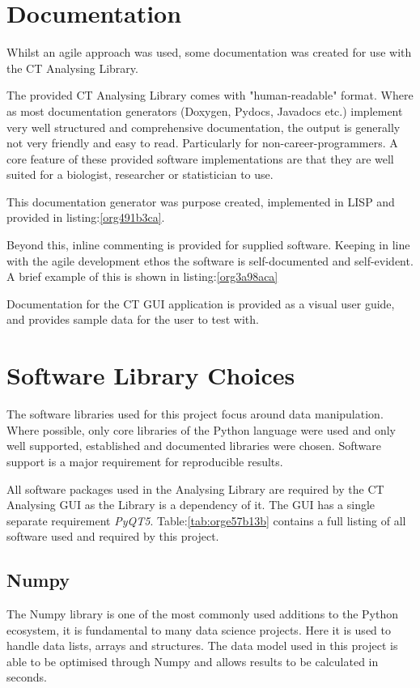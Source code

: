\documentclass[11pt]{report}
\begin{document}
\section{Documentation}
\label{sec:orgca517f7}
Whilst an agile approach was used, some documentation was created for use with the CT Analysing Library.

The provided CT Analysing Library comes with "human-readable" format. Where as most documentation generators (Doxygen, Pydocs, Javadocs etc.) implement very well structured and comprehensive documentation, the output is generally not very friendly and easy to read. Particularly for non-career-programmers. A core feature of these provided software implementations are that they are well suited for a biologist, researcher or statistician to use.

This documentation generator was purpose created, implemented in LISP and provided in listing:\ref{org491b3ca}.

Beyond this, inline commenting is provided for supplied software. Keeping in line with the agile development ethos the software is self-documented and self-evident. A brief example of this is shown in listing:\ref{org3a98aca}

Documentation for the CT GUI application is provided as a visual user guide, and provides sample data for the user to test with.
\section{Software Library Choices}
\label{sec:orgc2b4051}
The software libraries used for this project focus around data manipulation. Where possible, only core libraries of the Python language were used and only well supported, established and documented libraries were chosen. Software support is a major requirement for reproducible results.

All software packages used in the Analysing Library are required by the CT Analysing GUI as the Library is a dependency of it. The GUI has a single separate requirement \emph{PyQT5}.
Table:\ref{tab:orge57b13b} contains a full listing of all software used and required by this project.
\subsection{Numpy}
\label{sec:orgc8b5c8f}
The Numpy library is one of the most commonly used additions to the Python ecosystem, it is fundamental to many data science projects. Here it is used to handle data lists, arrays and structures. The data model used in this project is able to be optimised through Numpy and allows results to be calculated in seconds.
\end{document}
